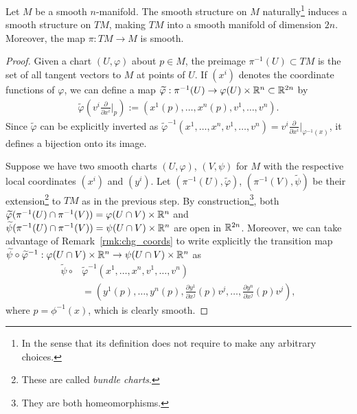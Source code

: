 \begin{theorem}\label{thm:tgbdlsmoothmfld}
  Let $M$ be a smooth $n$-manifold.
  The smooth structure on $M$ naturally\footnote{In the sense that its definition does not require to make any arbitrary choices.} induces a smooth structure on $TM$, making $TM$ into a smooth manifold of dimension $2n$.
  Moreover, the map $\pi: TM \to M$ is smooth.
\end{theorem}
\begin{proof}
  Given a chart $(U,\varphi)$ about $p\in M$, the preimage $\pi^{-1}(U) \subset TM$ is the set of all tangent vectors to $M$ at points of $U$.
  If $(x^i)$ denotes the coordinate functions of $\varphi$, we can define a map $\widetilde\varphi : \pi^{-1}(U) \to \varphi(U)\times\mathbb{R}^n \subset \mathbb{R}^{2n}$ by
  \begin{align}\label{eq:nat_coords}
    \widetilde\varphi\left(v^i \frac{\partial}{\partial x^i}\Big|_p\right) := \left(x^1(p), \ldots, x^n(p), v^1, \ldots, v^n\right).
  \end{align}
  Since $\widetilde\varphi$ can be explicitly inverted as $\widetilde\varphi^{-1}\left(x^1, \ldots, x^n, v^1, \ldots, v^n\right) = v^i \frac{\partial}{\partial x^i}\Big|_{\varphi^{-1}(x)}$, it defines a bijection onto its image.

  Suppose we have two smooth charts $(U,\varphi)$, $(V,\psi)$ for $M$ with the respective local coordinates $(x^i)$ and $(y^i)$.
  Let $(\pi^{-1}(U),\widetilde\varphi)$, $(\pi^{-1}(V),\widetilde\psi)$ be their extension\footnote{These are called \emph{bundle charts}.} to $TM$ as in the previous step.
  By construction\footnote{They are both homeomorphisms.}, both $\widetilde\varphi(\pi^{-1}(U)\cap\pi^{-1}(V)) = \varphi(U\cap V)\times\mathbb{R}^n$ and $\widetilde\psi(\pi^{-1}(U)\cap\pi^{-1}(V)) = \psi(U\cap V)\times\mathbb{R}^n$ are open in $\mathbb{R}^{2n}$.
  Moreover, we can take advantage of Remark~\ref{rmk:chg_coords} to write explicitly the transition map  $\widetilde\psi\circ\widetilde\varphi^{-1}: \varphi(U\cap V)\times\mathbb{R}^n \to \psi(U\cap V)\times\mathbb{R}^n$ as
  \begin{align}
    \widetilde\psi\circ&\widetilde\varphi^{-1}\left(x^1, \ldots, x^n, v^1, \ldots, v^n\right) \\
    &=\left(y^1(p),\ldots, y^n(p), \frac{\partial y^1}{\partial x^j}(p) v^j, \ldots, \frac{\partial y^n}{\partial x^j}(p) v^j\right),
  \end{align}
  where $p = \phi^{-1}(x)$, which is clearly smooth.
  

\end{proof}
